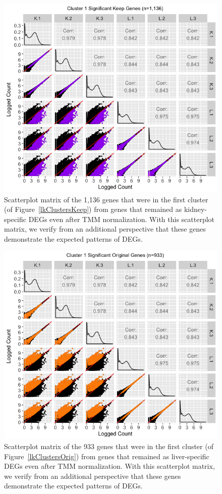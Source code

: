 \documentclass{article}
\begin{document}
  \null
  \begin{figure}[t!]
  \centerline{\includegraphics[width=1\columnwidth]{../MakeFigures/lkClustersKeepSM.jpg}}
  \caption{Scatterplot matrix of the 1,136 genes that were in the first cluster (of Figure~\ref{lkClustersKeep}) from genes that remained as kidney-specific DEGs even after TMM normalization. With this scatterplot matrix, we verify from an additional perspective that these genes demonstrate the expected patterns of DEGs.
  \label{lkClustersKeepSM}}
  \end{figure}
  
  \null
  \begin{figure}[t!]
  \centerline{\includegraphics[width=1\columnwidth]{../MakeFigures/lkClustersOrigSM.jpg}}
  \caption{Scatterplot matrix of the 933 genes that were in the first cluster (of Figure~\ref{lkClustersOrig}) from genes that remained as liver-specific DEGs even after TMM normalization. With this scatterplot matrix, we verify from an additional perspective that these genes demonstrate the expected patterns of DEGs.
  \label{lkClustersOrigSM}}
  \end{figure}
  
\end{document}
